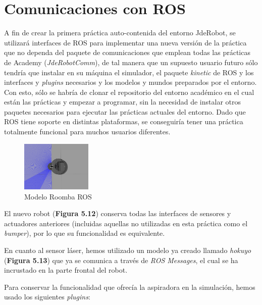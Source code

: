 \section{Comunicaciones con ROS}
A fin de crear la primera práctica auto-contenida del entorno JdeRobot, se utilizará interfaces de ROS para implementar una nueva versión de la práctica que no dependa del paquete de comunicaciones que emplean todas las prácticas de Academy (\textit{JdeRobotComm}), de tal manera que un supuesto usuario futuro sólo tendría que instalar en su máquina el simulador, el paquete \textit{kinetic} de ROS y los interfaces y \textit{plugins} necesarios y los modelos y mundos preparados por el entorno. Con esto, sólo se habría de clonar el repositorio del entorno académico en el cual están las prácticas y empezar a programar, sin la necesidad de instalar otros paquetes necesarios para ejecutar las prácticas actuales del entorno. Dado que ROS tiene soporte en distintas plataformas, se conseguiría tener una práctica totalmente funcional para muchos usuarios diferentes.

\begin{multicols}{2}
	\begin{figure}[H]
	\begin{center}
		\includegraphics[width=0.3\textwidth]{figures/create.png}
		\caption{Modelo Roomba ROS}
		\label{fig.create}
		\end{center}
\end{figure}

El nuevo robot (\textbf{Figura 5.12}) conserva todas las interfaces de sensores y actuadores anteriores (incluidas aquellas no utilizadas en esta práctica como el \textit{bumper}), por lo que su funcionalidad es equivalente.
\end{multicols}
En cuanto al sensor láser, hemos utilizado un modelo ya creado llamado \textit{hokuyo} (\textbf{Figura 5.13}) que ya se comunica a través de \textit{ROS Messages}, el cual se ha incrustado en la parte frontal del robot.

Para conservar la funcionalidad que ofrecía la aspiradora en la simulación, hemos usado los siguientes \textit{plugins}:

